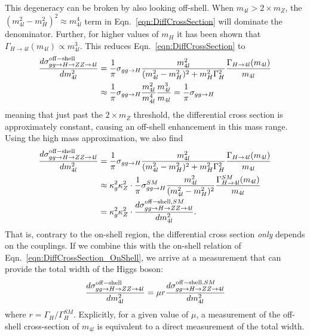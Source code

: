 This degeneracy can be broken by also looking off-shell. When $m_{4l}>2\times m_{Z}$, the $(m_{4l}^2-m_{H}^2)^2 \approx m_{4l}^4$ term in Eqn.~\ref{eqn:DiffCrossSection} will dominate the denominator. Further, for higher values of $m_H$ it has been shown \cite{} that $\Gamma_{H\rightarrow 4l}(m_{4l}) \propto m_{4l}^3$. This reduces Eqn.~\ref{eqn:DiffCrossSection} to
\begin{equation}
\begin{split}
\frac{d\sigma_{gg\rightarrow H\rightarrow ZZ\rightarrow 4l}^{\rm off-shell}}{dm^2_{4l}} &= \frac{1}{\pi} \sigma_{gg\rightarrow H} \frac{m_{4l}^2}{(m_{4l}^2-m_{H}^2)^2+m_H^2\Gamma_{H}^2}\frac{\Gamma_{H\rightarrow 4l}(m_{4l})}{m_{4l}} \\
&\approx \frac{1}{\pi} \sigma_{gg\rightarrow H} \frac{m_{4l}^2}{m_{4l}^4}\frac{m_{4l}^3}{m_{4l}} = \frac{1}{\pi} \sigma_{gg\rightarrow H}
\end{split}
\label{eqn:DiffCrossSection_OffShell}
\end{equation}
meaning that just past the $2\times m_{Z}$ threshold, the differential cross section is approximately constant, causing an off-shell enhancement in this mass range. Using the high mass approximation, we also find
\begin{equation}
\begin{split}
\frac{d\sigma_{gg\rightarrow H\rightarrow ZZ\rightarrow 4l}^{\rm off-shell}}{dm^2_{4l}} &= \frac{1}{\pi} \sigma_{gg\rightarrow H} \frac{m_{4l}^2}{(m_{4l}^2-m_{H}^2)^2+m_H^2\Gamma_{H}^2}\frac{\Gamma_{H\rightarrow 4l}(m_{4l})}{m_{4l}} \\
&\approx \kappa_g^2\kappa_Z^2 \cdot \frac{1}{\pi} \sigma_{gg\rightarrow H}^{SM} \frac{m_{4l}^2}{(m_{4l}^2-m_{H}^2)^2}\frac{\Gamma_{H\rightarrow 4l}^{SM}(m_{4l})}{m_{4l}} \\
&= \kappa_g^2\kappa_Z^2 \cdot \frac{d\sigma_{gg\rightarrow H\rightarrow ZZ\rightarrow 4l}^{{\rm off-shell},SM}}{dm^2_{4l}}.
\end{split}
\end{equation}
That is, contrary to the on-shell region, the differential cross section \textit{only} depends on the couplings. If we combine this with the on-shell relation of Eqn.~\ref{eqn:DiffCrossSection_OnShell}, we arrive at a measurement that can provide the total width of the Higgs boson:
\begin{equation}
\frac{d\sigma_{gg\rightarrow H\rightarrow ZZ\rightarrow 4l}^{\rm off-shell}}{dm^2_{4l}} = \mu r \frac{d\sigma_{gg\rightarrow H\rightarrow ZZ\rightarrow 4l}^{{\rm off-shell},SM}}{dm^2_{4l}}
\label{eqn:OffShellMeasurement}
\end{equation}
where $r=\Gamma_{H}/\Gamma_{H}^{SM}$. Explicitly, for a given value of $\mu$, a measurement of the off-shell cross-section of $m_{4l}$ is equivalent to a direct measurement of the total width.

